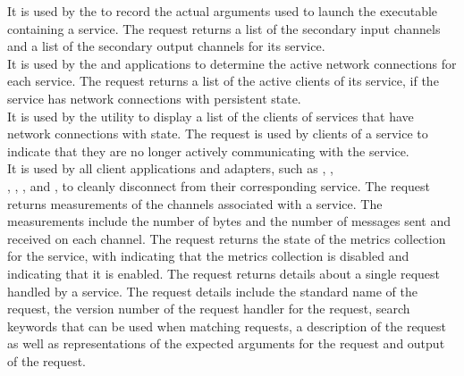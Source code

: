 It is used by the \emph{\CMU} to record the actual arguments used to launch the executable
containing a service.
The  request returns a list of the secondary input
channels and a list of the secondary output channels for its service.\\

It is used by the  and \emph{\CMU} applications to
determine the active \yarp{} network connections for each service.
The  request returns a list of the active clients of
its service, if the service has \yarp{} network connections with persistent state.\\

It is used by the  utility to display a list of the clients
of services that have \yarp{} network connections with state.
The  request is used by clients of a service to
indicate that they are no longer actively communicating with the service.\\

It is used by all client applications and adapters, such as
,
,\\
, ,
,
 and
, to cleanly disconnect from their
corresponding service.
The  request returns measurements of the channels
associated with a service.
The measurements include the number of bytes and the number of messages sent and
received on each channel.
The  request returns the state of the metrics
collection for the service, with  indicating that the metrics collection is
disabled and  indicating that it is enabled.
The  request returns details about a single request
handled by a service.
The request details include the standard name of the request, the version number of the
request handler for the request, search keywords that can be used when matching requests,
a description of the request as well as representations of the expected arguments for the
request and output of the request.\\

